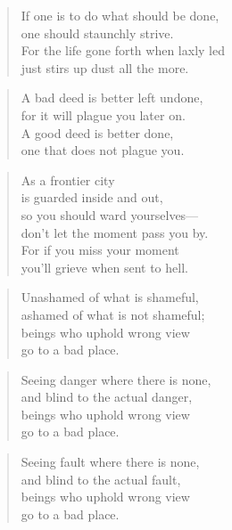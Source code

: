 \documentclass[12pt,openany]{book}%
\begin{document}
\begin{verse}%
If one is to do what should be done, \\
one should staunchly strive. \\
For the life gone forth when laxly led \\
just stirs up dust all the more. 

%
\end{verse}

\begin{verse}%
A bad deed is better left undone, \\
for it will plague you later on. \\
A good deed is better done, \\
one that does not plague you. 

%
\end{verse}

\begin{verse}%
As a frontier city \\
is guarded inside and out, \\
so you should ward yourselves—\\
don’t let the moment pass you by. \\
For if you miss your moment \\
you’ll grieve when sent to hell. 

%
\end{verse}

\begin{verse}%
Unashamed of what is shameful, \\
ashamed of what is not shameful; \\
beings who uphold wrong view \\
go to a bad place. 

%
\end{verse}

\begin{verse}%
Seeing danger where there is none, \\
and blind to the actual danger, \\
beings who uphold wrong view \\
go to a bad place. 

%
\end{verse}

\begin{verse}%
Seeing fault where there is none, \\
and blind to the actual fault, \\
beings who uphold wrong view \\
go to a bad place. 

%
\end{verse}
\end{document}
